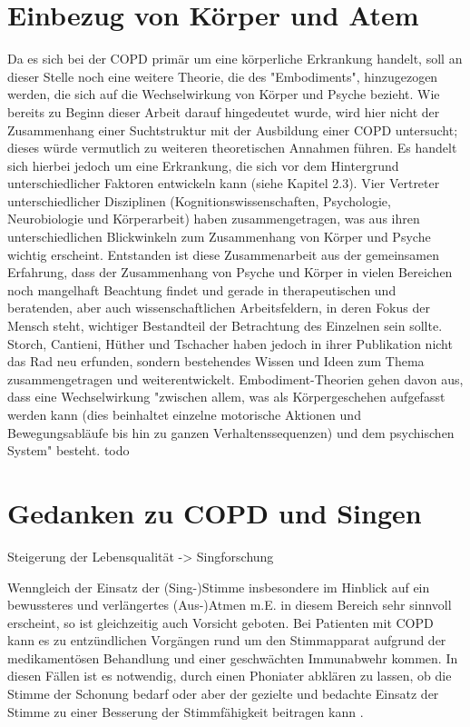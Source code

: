 \section{Einbezug von Körper und Atem} 
Da es sich bei der COPD primär um eine körperliche Erkrankung handelt, soll an dieser Stelle noch eine weitere Theorie, die des "Embodiments", hinzugezogen werden, die sich auf die Wechselwirkung von Körper und Psyche bezieht. Wie bereits zu Beginn dieser Arbeit darauf hingedeutet wurde, wird hier nicht der Zusammenhang einer Suchtstruktur mit der Ausbildung einer COPD untersucht; dieses würde vermutlich zu weiteren theoretischen Annahmen führen. Es handelt sich hierbei jedoch um eine Erkrankung, die sich vor dem Hintergrund unterschiedlicher Faktoren entwickeln kann (siehe Kapitel 2.3).
Vier Vertreter unterschiedlicher Disziplinen (Kognitionswissenschaften, Psychologie, Neurobiologie und Körperarbeit) haben zusammengetragen, was aus ihren unterschiedlichen Blickwinkeln zum Zusammenhang von Körper und Psyche wichtig erscheint. Entstanden ist diese Zusammenarbeit aus der gemeinsamen Erfahrung, dass der Zusammenhang von Psyche und Körper in vielen Bereichen noch mangelhaft Beachtung findet und gerade in therapeutischen und beratenden, aber auch wissenschaftlichen Arbeitsfeldern, in deren Fokus der Mensch steht, wichtiger Bestandteil der Betrachtung des Einzelnen sein sollte.
Storch, Cantieni, Hüther und Tschacher haben jedoch in ihrer Publikation nicht das Rad neu erfunden, sondern bestehendes Wissen und Ideen zum Thema zusammengetragen und weiterentwickelt. Embodiment-Theorien gehen davon aus, dass eine Wechselwirkung "zwischen allem, was als Körpergeschehen aufgefasst werden kann (dies beinhaltet einzelne motorische Aktionen und Bewegungsabläufe bis hin zu ganzen Verhaltenssequenzen) und dem psychischen System" \autocite[39]{hüther2010} besteht. todo

\section{Gedanken zu COPD und Singen}
Steigerung der Lebensqualität -> Singforschung

Wenngleich der Einsatz der (Sing-)Stimme insbesondere im Hinblick auf ein bewussteres und verlängertes (Aus-)Atmen m.E. in diesem Bereich sehr sinnvoll erscheint, so ist gleichzeitig auch Vorsicht geboten. Bei Patienten mit COPD kann es zu entzündlichen Vorgängen rund um den Stimmapparat aufgrund der medikamentösen Behandlung und einer geschwächten Immunabwehr kommen. In diesen Fällen ist es notwendig, durch einen Phoniater abklären zu lassen, ob die Stimme der Schonung bedarf oder aber der gezielte und bedachte Einsatz der Stimme zu einer Besserung der Stimmfähigkeit beitragen kann \autocite[vgl.][103ff.]{alavi2009}.


